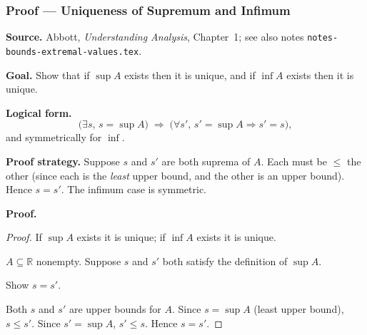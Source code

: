 
\clearpage
{}
\hypertarget{proof-RA-ABB-P-sup-unique}{}

\subsubsection[Uniqueness of Supremum and Infimum]{Proof --- Uniqueness of Supremum and Infimum}

\bigskip

\noindent
\textbf{Source.}
Abbott, \emph{Understanding Analysis}, Chapter~1; see also notes
\texttt{notes-bounds-extremal-values.tex}.

\vspace{0.75em}

\noindent
\textbf{Goal.}
Show that if $\sup A$ exists then it is unique, and if $\inf A$ exists then
it is unique.

\vspace{0.75em}

\noindent
\textbf{Logical form.}
\[
  \bigl(\exists s,\, s = \sup A\bigr)
  \;\Rightarrow\;
  \bigl(\forall s',\, s' = \sup A \Rightarrow s' = s\bigr),
\]
and symmetrically for $\inf$.

\vspace{0.75em}

\noindent
\textbf{Proof strategy.}
Suppose $s$ and $s'$ are both suprema of $A$.
Each must be $\le$ the other (since each is the \emph{least} upper bound,
and the other is an upper bound). Hence $s = s'$.
The infimum case is symmetric.

\vspace{0.75em}

\noindent
\textbf{Proof.}
\begin{proof}
\Claim If $\sup A$ exists it is unique; if $\inf A$ exists it is unique.

\Given $A \subseteq \mathbb{R}$ nonempty. Suppose $s$ and $s'$ both satisfy
the definition of $\sup A$.

\Goal Show $s = s'$.

\Strategy Both $s$ and $s'$ are upper bounds for $A$.
Since $s = \sup A$ (least upper bound), $s \le s'$.
Since $s' = \sup A$, $s' \le s$.
Hence $s = s'$.

\medskip


\end{proof}

